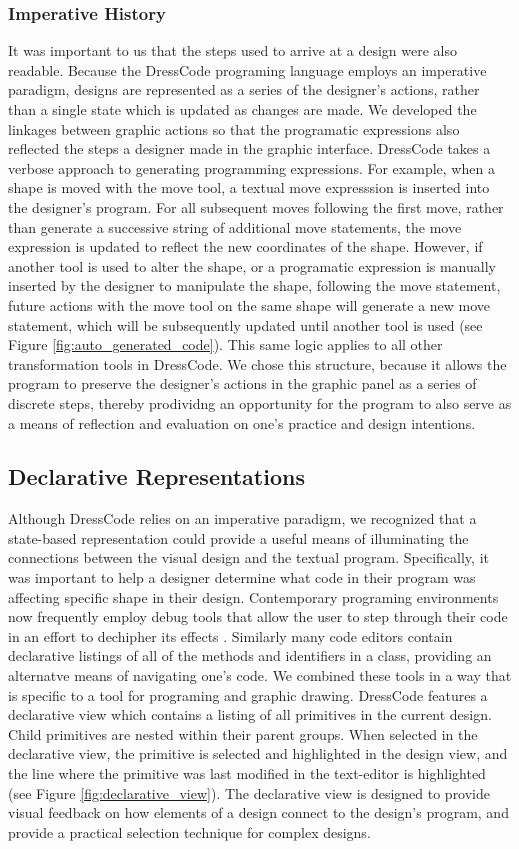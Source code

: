 \documentclass{sigchi}
\begin{document}
\subsubsection{Imperative History}
It was important to us that the steps used to arrive at a design were also readable. Because the DressCode programing language employs an imperative paradigm, designs are represented as a series of the designer's actions, rather than a single state which is updated as changes are made. We developed the linkages between graphic actions so that the programatic expressions also reflected the steps a designer made in the graphic interface. DressCode takes a verbose approach to generating programming expressions. For example, when a shape is moved with the move tool, a textual move expresssion is inserted into the designer's program. For all subsequent moves following the first move, rather than generate a successive string of additional move statements, the move expression is updated to reflect the new coordinates of the shape. However, if another tool is used to alter the shape, or a programatic expression is manually inserted by the designer to manipulate the shape, following the move statement, future actions with the move tool on the same shape will generate a new move statement, which will be subsequently updated until another tool is used (see Figure \ref{fig:auto_generated_code}).  This same logic applies to all other transformation tools in DressCode. We chose this structure, because it allows the program to preserve the designer's actions in the graphic panel as a series of discrete steps, thereby prodividng an opportunity  for the program to also serve as a means of reflection and evaluation on one's practice and design intentions. 

\subsection{Declarative Representations}
Although DressCode relies on an imperative paradigm, we recognized that a state-based representation could provide a useful means of illuminating the connections between the visual design and the textual program. Specifically, it was important to help a designer determine what code in their program was affecting specific shape in their design. Contemporary programing environments now frequently employ debug tools that allow the user to step through their code in an effort to dechipher its effects \cite{need citation}. Similarly many code editors contain declarative listings of all of the methods and identifiers in a class, providing an alternatve means of navigating one's code. We combined these tools in a way that is specific to a tool for programing and graphic drawing. DressCode features a declarative view which contains a listing of all primitives in the current design. Child primitives are nested within their parent groups. When selected in the declarative view, the primitive is selected and highlighted in the design view, and the line where the primitive was last modified in the text-editor is highlighted (see Figure \ref{fig:declarative_view}). The declarative view is designed to provide visual feedback on how elements of a design connect to the design's program, and provide a practical selection technique for complex designs.
\end{document}
